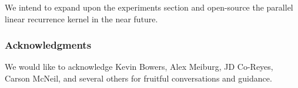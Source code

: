 \documentclass{article}
\begin{document}
We intend to expand upon the experiments section and open-source the parallel linear recurrence kernel in the near future.

\subsubsection*{Acknowledgments}
We would like to acknowledge Kevin Bowers, Alex Meiburg, JD Co-Reyes, Carson McNeil, and several others for fruitful conversations and guidance.


\end{document}
